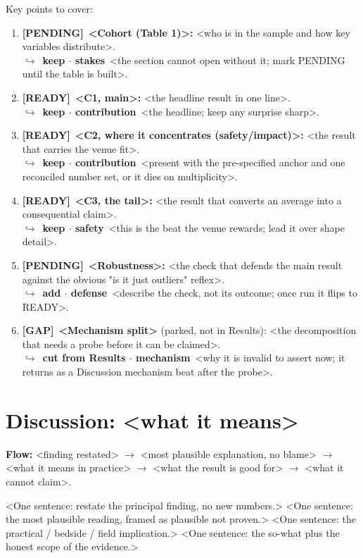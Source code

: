 \documentclass[11pt]{article}
\newcommand{\rdy}{\textcolor{cReady}{\textbf{[READY]}}}   %
\newcommand{\pend}{\textcolor{cPend}{\textbf{[PENDING]}}} %
\newcommand{\gp}{\textcolor{cGap}{\textbf{[GAP]}}}        %
\newcommand{\rev}[2]{\\{\footnotesize\color{gray}$\hookrightarrow$~\textbf{#1}~#2}}
\begin{document}
Key points to cover:
\begin{enumerate}
\item \pend~\textbf{<Cohort (Table 1)>:} <who is in the sample and how key variables distribute>. \rev{keep $\cdot$ stakes}{<the section cannot open without it; mark PENDING until the table is built>.}
\item \rdy~\textbf{<C1, main>:} <the headline result in one line>. \rev{keep $\cdot$ contribution}{<the headline; keep any surprise sharp>.}
\item \rdy~\textbf{<C2, where it concentrates (safety/impact)>:} <the result that carries the venue fit>. \rev{keep $\cdot$ contribution}{<present with the pre-specified anchor and one reconciled number set, or it dies on multiplicity>.}
\item \rdy~\textbf{<C3, the tail>:} <the result that converts an average into a consequential claim>. \rev{keep $\cdot$ safety}{<this is the beat the venue rewards; lead it over shape detail>.}
\item \pend~\textbf{<Robustness>:} <the check that defends the main result against the obvious "is it just outliers" reflex>. \rev{add $\cdot$ defense}{<describe the check, not its outcome; once run it flips to READY>.}
\item \gp~\textbf{<Mechanism split>} (parked, not in Results): <the decomposition that needs a probe before it can be claimed>. \rev{cut from Results $\cdot$ mechanism}{<why it is invalid to assert now; it returns as a Discussion mechanism beat after the probe>.}
\end{enumerate}

\section*{Discussion: <what it means>}

\noindent\textbf{Flow:} <finding restated> $\rightarrow$ <most plausible explanation, no blame> $\rightarrow$ <what it means in practice> $\rightarrow$ <what the result is good for> $\rightarrow$ <what it cannot claim>.

<One sentence: restate the principal finding, no new numbers.>
%
<One sentence: the most plausible reading, framed as plausible not proven.>
%
<One sentence: the practical / bedside / field implication.>
%
<One sentence: the so-what plus the honest scope of the evidence.>
\end{document}
